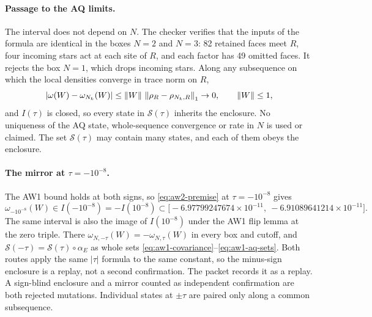 \paragraph{Passage to the AQ limits.}
The interval does not depend on $N$. The checker verifies that the inputs of
the formula are identical in the boxes $N=2$ and $N=3$: 82 retained faces meet
$R$, four incoming stars act at each site of $R$, and each factor has 49
omitted faces. It rejects the box $N=1$, which drops incoming stars. Along any
subsequence on which the local densities converge in trace norm on $R$,
\begin{equation}
 |\omega(W)-\omega_{N_k}(W)|\le\left\lVert W\right\rVert\,\left\lVert\rho_R-\rho_{N_k,R}\right\rVert_1\to0,
 \qquad\left\lVert W\right\rVert\le1 ,
 \label{eq:aw2-passage}
\end{equation}
and $I(\tau)$ is closed, so every state in $\mathcal S(\tau)$ inherits the
enclosure. No uniqueness of the AQ state, whole-sequence convergence or rate
in $N$ is used or claimed. The set $\mathcal S(\tau)$ may contain many states,
and each of them obeys the enclosure.

\paragraph{The mirror at $\tau=-10^{-8}$.}
The AW1 bound holds at both signs, so \eqref{eq:aw2-premise} at
$\tau=-10^{-8}$ gives
\begin{equation}
 \omega_{-10^{-8}}(W)\in I(-10^{-8})=-I(10^{-8})
 \subset\bigl[-6.97799247674\times10^{-11},\ -6.91089641214\times10^{-11}\bigr].
 \label{eq:aw2-mirror}
\end{equation}
The same interval is also the image of $I(10^{-8})$ under the AW1 flip lemma
at the zero triple. There $\omega_{N,-\tau}(W)=-\omega_{N,\tau}(W)$ in every
box and cutoff, and $\mathcal S(-\tau)=\mathcal S(\tau)\circ\alpha_E$ as whole
sets \eqref{eq:aw1-covariance}--\eqref{eq:aw1-aq-sets}. Both routes apply the
same $|\tau|$ formula to the same constant, so the minus-sign enclosure is a
replay, not a second confirmation. The packet records it as a replay. A
sign-blind enclosure and a mirror counted as independent confirmation are both
rejected mutations. Individual states at $\pm\tau$ are paired only along a
common subsequence.

